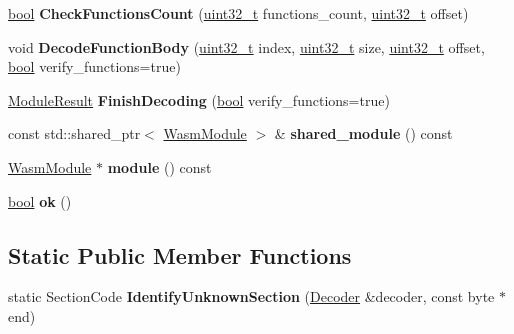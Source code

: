 \begin{DoxyCompactItemize}
\mbox{\hyperlink{classbool}{bool}} {\bfseries Check\+Functions\+Count} (\mbox{\hyperlink{classuint32__t}{uint32\+\_\+t}} functions\+\_\+count, \mbox{\hyperlink{classuint32__t}{uint32\+\_\+t}} offset)
\item 
\mbox{\label{classv8_1_1internal_1_1wasm_1_1ModuleDecoder_a49b39b2b2225fc6e5bc7f330b5ba741f}} 
void {\bfseries Decode\+Function\+Body} (\mbox{\hyperlink{classuint32__t}{uint32\+\_\+t}} index, \mbox{\hyperlink{classuint32__t}{uint32\+\_\+t}} size, \mbox{\hyperlink{classuint32__t}{uint32\+\_\+t}} offset, \mbox{\hyperlink{classbool}{bool}} verify\+\_\+functions=true)
\item 
\mbox{\label{classv8_1_1internal_1_1wasm_1_1ModuleDecoder_a979b96da61e0f7241bc4442cea32a1cf}} 
\mbox{\hyperlink{classv8_1_1internal_1_1wasm_1_1Result}{Module\+Result}} {\bfseries Finish\+Decoding} (\mbox{\hyperlink{classbool}{bool}} verify\+\_\+functions=true)
\item 
\mbox{\label{classv8_1_1internal_1_1wasm_1_1ModuleDecoder_a8acb438d35687ddde33f2711f57fc43e}} 
const std\+::shared\+\_\+ptr$<$ \mbox{\hyperlink{structv8_1_1internal_1_1wasm_1_1WasmModule}{Wasm\+Module}} $>$ \& {\bfseries shared\+\_\+module} () const
\item 
\mbox{\label{classv8_1_1internal_1_1wasm_1_1ModuleDecoder_a8b70e09648e0eff724498aace4f9b98d}} 
\mbox{\hyperlink{structv8_1_1internal_1_1wasm_1_1WasmModule}{Wasm\+Module}} $\ast$ {\bfseries module} () const
\item 
\mbox{\label{classv8_1_1internal_1_1wasm_1_1ModuleDecoder_a9eec4b4068701e571bcba4f5588c3eb2}} 
\mbox{\hyperlink{classbool}{bool}} {\bfseries ok} ()
\end{DoxyCompactItemize}
\subsection*{Static Public Member Functions}
\begin{DoxyCompactItemize}
\item 
\mbox{\label{classv8_1_1internal_1_1wasm_1_1ModuleDecoder_a370459597ebc3071d940fe26b29961f5}} 
static Section\+Code {\bfseries Identify\+Unknown\+Section} (\mbox{\hyperlink{classv8_1_1internal_1_1wasm_1_1Decoder}{Decoder}} \&decoder, const byte $\ast$end)
\end{DoxyCompactItemize}


